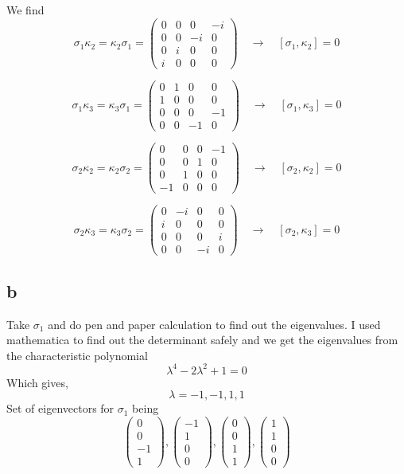 \documentclass[letter]{article}
\begin{document}
We find 
\[
\sigma_1 \kappa_2 = \kappa_2 \sigma_1 
=\begin{pmatrix} 0&0&0&-i\\0&0&-i&0\\0&i&0&0\\i&0&0&0 \end{pmatrix} 
\quad 
\to \quad [\sigma_1, \kappa_2] = 0\]

\[
\sigma_1 \kappa_3 = \kappa_3 \sigma_1 = 
\begin{pmatrix} 0&1&0&0\\1&0&0&0\\0&0&0&-1\\0&0&-1&0 \end{pmatrix} 
\quad \to \quad [\sigma_1, \kappa_3]=0 \] 

\[
\sigma_2 \kappa_2 = \kappa_2 \sigma_2 = 
\begin{pmatrix} 0&0&0&-1\\0&0&1&0\\0&1&0&0\\-1&0&0&0 \end{pmatrix}  
\quad \to \quad [\sigma_2, \kappa_2] = 0
\]

\[
\sigma_2 \kappa_3 = \kappa_3 \sigma_2 = 
\begin{pmatrix} 0&-i&0&0\\i&0&0&0\\0&0&0&i\\0&0&-i&0  \end{pmatrix}  
\quad \to \quad [\sigma_2, \kappa_3] = 0
\]

\newpage
\subsection*{b}
Take $\sigma_1$ and do pen and paper calculation to find out the eigenvalues. I used mathematica to find out the determinant safely and we get the eigenvalues from the characteristic polynomial
\[
\lambda^{4} - 2 \lambda^2 + 1 = 0
\]
Which gives, 
\[
\lambda = -1, -1, 1, 1
\]
Set of eigenvectors for $\sigma_1$ being 
\[
\begin{pmatrix} 0\\0\\-1\\1 \end{pmatrix} , 
\begin{pmatrix} -1\\1\\0\\0 \end{pmatrix} ,
\begin{pmatrix} 0\\0\\1\\1 \end{pmatrix} ,
\begin{pmatrix} 1\\1\\0\\0 \end{pmatrix} 
\]
\end{document}
